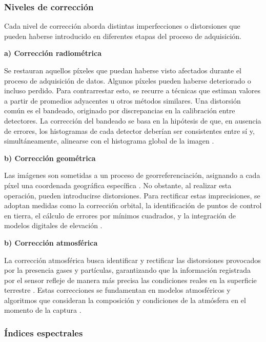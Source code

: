 \subsubsection{Niveles de corrección}

Cada nivel de corrección aborda distintas imperfecciones o distorsiones que pueden haberse introducido en diferentes etapas del proceso de adquisición.

\textbf{a) Corrección radiométrica}

Se restauran aquellos píxeles que puedan haberse visto afectados durante el proceso de adquisición de datos. Algunos píxeles pueden haberse deteriorado o incluso perdido. Para contrarrestar esto, se recurre a técnicas que estiman valores a partir de promedios adyacentes u otros métodos similares. Una distorsión común es el bandeado, originado por discrepancias en la calibración entre detectores. La corrección del bandeado se basa en la hipótesis de que, en ausencia de errores, los histogramas de cada detector deberían ser consistentes entre sí y, simultáneamente, alinearse con el histograma global de la imagen \cite{jensen2016introductory}.

\textbf{b) Corrección geométrica}

Las imágenes son sometidas a un proceso de georreferenciación, asignando a cada píxel una coordenada geográfica específica \cite{chuvieco2016fundamentals}. No obstante, al realizar esta operación, pueden introducirse distorsiones. Para rectificar estas imprecisiones, se adoptan medidas como la corrección orbital, la identificación de puntos de control en tierra, el cálculo de errores por mínimos cuadrados, y la integración de modelos digitales de elevación \cite{jensen2016introductory}.

\textbf{b) Corrección atmosférica}

La corrección atmosférica busca identificar y rectificar las distorsiones provocados por la presencia gases y partículas, garantizando que la información registrada por el sensor refleje de manera más precisa las condiciones reales en la superficie terrestre \cite{bravo2017teledeteccion}. Estas correcciones se fundamentan en modelos atmosféricos y algoritmos que consideran la composición y condiciones de la atmósfera en el momento de la captura \cite{jensen2016introductory}.

\subsubsection{Índices espectrales}

